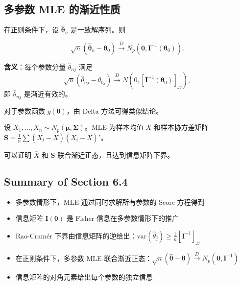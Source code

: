\subsection{多参数 MLE 的渐近性质}

\begin{theorem}\label{th:multiparameter-mle-asymptotic}
在正则条件下，设 $\widehat{\boldsymbol{\theta}}_n$ 是一致解序列。则

\[
\sqrt{n}(\widehat{\boldsymbol{\theta}}_n - \boldsymbol{\theta}_0) \xrightarrow{D} N_p(\mathbf{0}, \mathbf{I}^{-1}(\boldsymbol{\theta}_0)).
\label{eq:multiparameter-mle-asymptotic}
\]
\end{theorem}

\textbf{含义}：每个参数分量 $\widehat{\theta}_{nj}$ 满足
\[
\sqrt{n}(\widehat{\theta}_{nj} - \theta_{0j}) \xrightarrow{D} N(0, [\mathbf{I}^{-1}(\boldsymbol{\theta}_0)]_{jj}),
\]
即 $\widehat{\theta}_{nj}$ 是渐近有效的。

对于参数函数 $g(\boldsymbol{\theta})$，由 Delta 方法可得类似结论。

\begin{example}[正态协方差矩阵估计]\label{ex:covariance-estimation}
设 $X_1, \ldots, X_n \sim N_p(\boldsymbol{\mu}, \boldsymbol{\Sigma})$。MLE 为样本均值 $\bar{X}$ 和样本协方差矩阵 $\mathbf{S} = \frac{1}{n}\sum(X_i - \bar{X})(X_i - \bar{X})'$。

可以证明 $\bar{X}$ 和 $\mathbf{S}$ 联合渐近正态，且达到信息矩阵下界。
\end{example}

\subsection{Summary of Section 6.4}

\begin{itemize}
\item 多参数情形下，MLE 通过同时求解所有参数的 Score 方程得到
\item 信息矩阵 $\mathbf{I}(\boldsymbol{\theta})$ 是 Fisher 信息在多参数情形下的推广
\item Rao-Cramér 下界由信息矩阵的逆给出：$\text{var}(\widehat{\theta}_j) \geq \frac{1}{n}[\mathbf{I}^{-1}]_{jj}$
\item 在正则条件下，多参数 MLE 联合渐近正态：$\sqrt{n}(\widehat{\boldsymbol{\theta}} - \boldsymbol{\theta}) \xrightarrow{D} N_p(\mathbf{0}, \mathbf{I}^{-1})$
\item 信息矩阵的对角元素给出每个参数的独立信息
\end{itemize}

